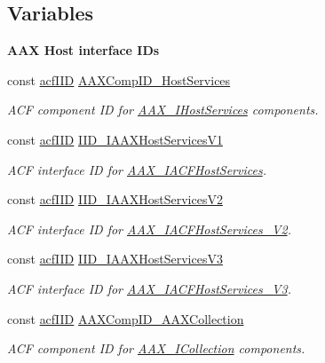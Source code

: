 \subsection*{Variables}
\begin{Indent}{\bf A\+A\+X Host interface I\+Ds}\par
\begin{DoxyCompactItemize}
\item 
const \hyperlink{a00150_a59df0b41744eee7a066787aaedf97f67}{acf\+I\+I\+D} \hyperlink{a00299_a0790e4ae407d6560ce1f605f29df324f}{A\+A\+X\+Comp\+I\+D\+\_\+\+Host\+Services}
\begin{DoxyCompactList}\small\item\em A\+C\+F component I\+D for \hyperlink{a00103}{A\+A\+X\+\_\+\+I\+Host\+Services} components. \end{DoxyCompactList}\item 
const \hyperlink{a00150_a59df0b41744eee7a066787aaedf97f67}{acf\+I\+I\+D} \hyperlink{a00299_aa2268f8c1f129f4f75a27ea3f4a4183b}{I\+I\+D\+\_\+\+I\+A\+A\+X\+Host\+Services\+V1}
\begin{DoxyCompactList}\small\item\em A\+C\+F interface I\+D for \hyperlink{a00071}{A\+A\+X\+\_\+\+I\+A\+C\+F\+Host\+Services}. \end{DoxyCompactList}\item 
const \hyperlink{a00150_a59df0b41744eee7a066787aaedf97f67}{acf\+I\+I\+D} \hyperlink{a00299_a19fae45f6510abfe803b5513bf3f2b85}{I\+I\+D\+\_\+\+I\+A\+A\+X\+Host\+Services\+V2}
\begin{DoxyCompactList}\small\item\em A\+C\+F interface I\+D for \hyperlink{a00072}{A\+A\+X\+\_\+\+I\+A\+C\+F\+Host\+Services\+\_\+\+V2}. \end{DoxyCompactList}\item 
const \hyperlink{a00150_a59df0b41744eee7a066787aaedf97f67}{acf\+I\+I\+D} \hyperlink{a00299_ac6e4f090679f63cbed6538c9b08dc119}{I\+I\+D\+\_\+\+I\+A\+A\+X\+Host\+Services\+V3}
\begin{DoxyCompactList}\small\item\em A\+C\+F interface I\+D for \hyperlink{a00073}{A\+A\+X\+\_\+\+I\+A\+C\+F\+Host\+Services\+\_\+\+V3}. \end{DoxyCompactList}\item 
const \hyperlink{a00150_a59df0b41744eee7a066787aaedf97f67}{acf\+I\+I\+D} \hyperlink{a00299_adce9a55e7654b4bb7e41cdc8d91d119d}{A\+A\+X\+Comp\+I\+D\+\_\+\+A\+A\+X\+Collection}
\begin{DoxyCompactList}\small\item\em A\+C\+F component I\+D for \hyperlink{a00087}{A\+A\+X\+\_\+\+I\+Collection} components. \end{DoxyCompactList}\item 

\end{DoxyCompactItemize}
\end{Indent}
